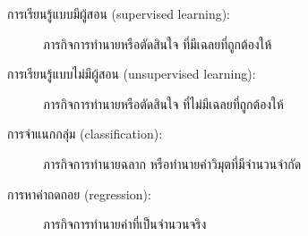 \begin{description}
	
	\item[การเรียนรู้แบบมีผู้สอน (supervised learning):]
	ภารกิจการทำนายหรือตัดสินใจ ที่มีเฉลยที่ถูกต้องให้


	\item[การเรียนรู้แบบไม่มีผู้สอน (unsupervised learning):]
    ภารกิจการทำนายหรือตัดสินใจ ที่ไม่มีเฉลยที่ถูกต้องให้
    
    \item[การจำแนกกลุ่ม (classification):]
    ภารกิจการทำนายฉลาก หรือทำนายค่าวิมุตที่มีจำนวนจำกัด
    
    
    \item[การหาค่าถดถอย (regression):]
    ภารกิจการทำนายค่าที่เป็นจำนวนจริง



%
%

	
\end{description}


